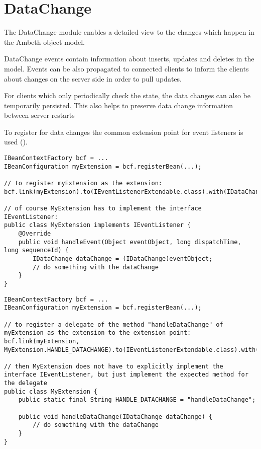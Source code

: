 \section{DataChange}
\label{module:DataChange}
\ClearAPI
\TODO
The DataChange module enables a detailed view to the changes which happen in the Ambeth object model. 

DataChange events contain information about inserts, updates and deletes in the model. Events can be also propagated to connected clients to inform the clients about changes on the server side in order to pull updates.

For clients which only periodically check the state, the data changes can also be temporarily persisted. This also helps to preserve data change information between server restarts

To register for data changes the common extension point for event listeners is used ().

\begin{lstlisting}[style=Java,caption={Example to declare and register an event handler for data changes (Java)}]
IBeanContextFactory bcf = ...
IBeanConfiguration myExtension = bcf.registerBean(...);

// to register myExtension as the extension:
bcf.link(myExtension).to(IEventListenerExtendable.class).with(IDataChange.class);

// of course MyExtension has to implement the interface IEventListener:
public class MyExtension implements IEventListener {
	@Override
	public void handleEvent(Object eventObject, long dispatchTime, long sequenceId) {
		IDataChange dataChange = (IDataChange)eventObject;
		// do something with the dataChange
	}
}
\end{lstlisting}

\begin{lstlisting}[style=Java,caption={Example to declare and register a delegate of a bean as an event handler for data changes (Java)}]
IBeanContextFactory bcf = ...
IBeanConfiguration myExtension = bcf.registerBean(...);

// to register a delegate of the method "handleDataChange" of myExtension as the extension to the extension point:
bcf.link(myExtension, MyExtension.HANDLE_DATACHANGE).to(IEventListenerExtendable.class).with(IDataChange.class);

// then MyExtension does not have to explicitly implement the interface IEventListener, but just implement the expected method for the delegate
public class MyExtension {
	public static final String HANDLE_DATACHANGE = "handleDataChange";

	public void handleDataChange(IDataChange dataChange) {
		// do something with the dataChange
	}
}
\end{lstlisting}

